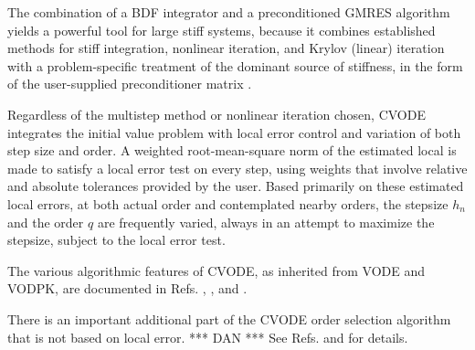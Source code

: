 The combination of a BDF integrator and a preconditioned GMRES
algorithm yields a powerful tool for large stiff systems, because it
combines established methods for stiff integration, nonlinear
iteration, and Krylov (linear) iteration with a problem-specific
treatment of the dominant source of stiffness, in the form of the
user-supplied preconditioner matrix \cite{BrHi:89}.

Regardless of the multistep method or nonlinear iteration chosen,
CVODE integrates the initial value problem with local error control
and variation of both step size and order.  A weighted root-mean-square
norm of the estimated local is made to satisfy a local error test on
every step, using weights that involve relative and absolute
tolerances provided by the user.  Based primarily on these estimated
local errors, at both actual order and contemplated nearby orders, the
stepsize $h_n$ and the order $q$ are frequently varied, always in an
attempt to maximize the stepsize, subject to the local error test.

The various algorithmic features of CVODE, as inherited from VODE and
VODPK, are documented in Refs. \cite{BBH:89}, \cite{Byr:92}, and
\cite{Hin:00}.

There is an important additional part of the CVODE order selection
algorithm that is not based on local error.  
*** DAN *** 
See Refs. \cite{Hin:92} and \cite{Hin:95} for details.

